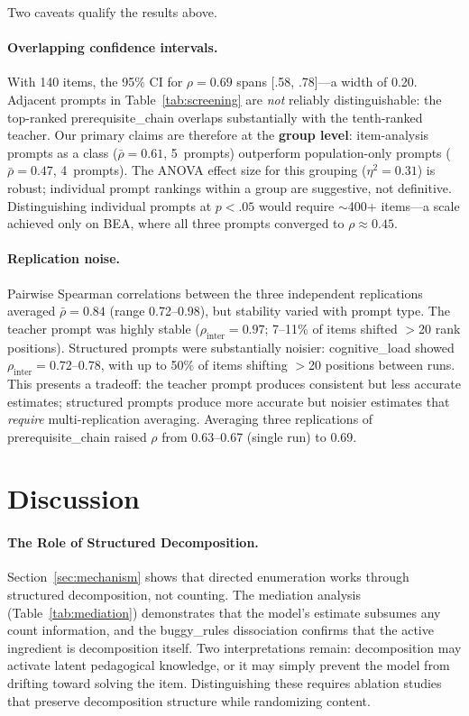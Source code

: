 \documentclass[runningheads]{llncs}
\begin{document}
Two caveats qualify the results above.

\paragraph{Overlapping confidence intervals.} With 140 items, the 95\% CI for $\rho = 0.69$ spans [.58, .78]---a width of 0.20. Adjacent prompts in Table~\ref{tab:screening} are \emph{not} reliably distinguishable: the top-ranked prerequisite\_chain overlaps substantially with the tenth-ranked teacher. Our primary claims are therefore at the \textbf{group level}: item-analysis prompts as a class ($\bar{\rho} = 0.61$, 5~prompts) outperform population-only prompts ($\bar{\rho} = 0.47$, 4~prompts). The ANOVA effect size for this grouping ($\eta^2 = 0.31$) is robust; individual prompt rankings within a group are suggestive, not definitive. Distinguishing individual prompts at $p < .05$ would require $\sim$400+ items---a scale achieved only on BEA, where all three prompts converged to $\rho \approx 0.45$.

\paragraph{Replication noise.} Pairwise Spearman correlations between the three independent replications averaged $\bar{\rho} = 0.84$ (range 0.72--0.98), but stability varied with prompt type. The teacher prompt was highly stable ($\rho_{\mathrm{inter}} = 0.97$; 7--11\% of items shifted $>$20 rank positions). Structured prompts were substantially noisier: cognitive\_load showed $\rho_{\mathrm{inter}} = 0.72$--$0.78$, with up to 50\% of items shifting $>$20 positions between runs. This presents a tradeoff: the teacher prompt produces consistent but less accurate estimates; structured prompts produce more accurate but noisier estimates that \emph{require} multi-replication averaging. Averaging three replications of prerequisite\_chain raised $\rho$ from 0.63--0.67 (single run) to 0.69.



\section{Discussion}

\paragraph{The Role of Structured Decomposition.}
Section~\ref{sec:mechanism} shows that directed enumeration works through structured decomposition, not counting. The mediation analysis (Table~\ref{tab:mediation}) demonstrates that the model's estimate subsumes any count information, and the buggy\_rules dissociation confirms that the active ingredient is decomposition itself. Two interpretations remain: decomposition may activate latent pedagogical knowledge, or it may simply prevent the model from drifting toward solving the item. Distinguishing these requires ablation studies that preserve decomposition structure while randomizing content.
\end{document}
